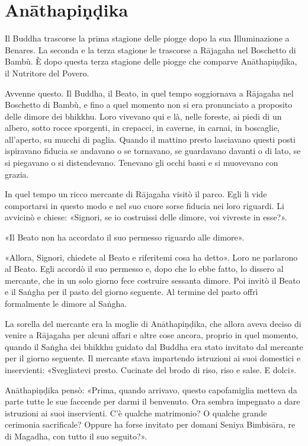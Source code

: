 \chapter{Anāthapiṇḍika}

 Il Buddha trascorse la prima stagione delle piogge
dopo la sua Illuminazione a Benares. La seconda e la terza stagione le
trascorse a Rājagaha nel Boschetto di Bambù. È dopo questa terza
stagione delle piogge che comparve Anāthapiṇḍika, il Nutritore del
Povero.


 Avvenne questo. Il Buddha, il Beato, in quel tempo
soggiornava a Rājagaha nel Boschetto di Bambù, e fino a quel momento non
si era pronunciato a proposito delle dimore dei bhikkhu. Loro vivevano
qui e là, nelle foreste, ai piedi di un albero, sotto rocce sporgenti,
in crepacci, in caverne, in carnai, in boscaglie, all’aperto, su mucchi
di paglia. Quando il mattino presto lasciavano questi posti ispiravano
fiducia se andavano o se tornavano, se guardavano davanti o di lato, se
si piegavano o si distendevano. Tenevano gli occhi bassi e si muovevano
con grazia.


In quel tempo un ricco mercante di Rājagaha visitò il parco. Egli li
vide comportarsi in questo modo e nel suo cuore sorse fiducia nei loro
riguardi. Li avvicinò e chiese: «Signori, se io costruissi delle dimore,
voi vivreste in esse?».


«Il Beato non ha accordato il suo permesso riguardo alle dimore».


«Allora, Signori, chiedete al Beato e riferitemi cosa ha detto». Loro ne
parlarono al Beato. Egli accordò il suo permesso e, dopo che lo ebbe
fatto, lo dissero al mercante, che in un solo giorno fece costruire
sessanta dimore. Poi invitò il Beato e il Saṅgha per il pasto del giorno
seguente. Al termine del pasto offrì formalmente le dimore al Saṅgha.


La sorella del mercante era la moglie di Anāthapiṇḍika, che allora aveva
deciso di venire a Rājagaha per alcuni affari e altre cose ancora,
proprio in quel momento, quando il Saṅgha dei bhikkhu guidato dal Buddha
era stato invitato dal mercante per il giorno seguente. Il mercante
stava impartendo istruzioni ai suoi domestici e inservienti:
«Svegliatevi presto. Cucinate del brodo di riso, riso e salse. E dolci».


Anāthapiṇḍika pensò: «Prima, quando arrivavo, questo capofamiglia
metteva da parte tutte le sue faccende per darmi il benvenuto. Ora
sembra impegnato a dare istruzioni ai suoi inservienti. C’è qualche
matrimonio? O qualche grande cerimonia sacrificale? Oppure ha forse
invitato per domani Seniya Bimbisāra, re di Magadha, con tutto il suo
seguito?».


